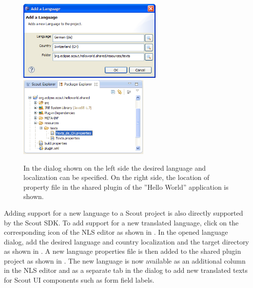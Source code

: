 \documentclass[a4paper,10pt,twoside]{book}
\begin{document}
\begin{figure}
\includegraphics[height=4cm]{sdk_add_language_dialog.png} \hspace{0.5cm}
\includegraphics[height=4cm]{sdk_shared_plugin_language_file.png}
\caption{In the dialog  shown on the left side the desired language and localization can be specified.
On the right side, the location of property file  in the shared plugin of the ''Hello World'' application is shown.
}
\end{figure}

Adding support for a new language to a Scout project is also directly supported by the Scout SDK. 
To add support for a new translated language, click on the corresponding icon of the NLS editor as shown in .
In the opened language dialog, add the desired language and country localization and the target directory as shown in .
A new language properties file is then added to the shared plugin project as shown in .
The new language is now available as an additional column in the NLS editor and as a separate tab in the dialog to add new translated texts for Scout UI components such as form field labels.

\ifx\wholebook\relax\else
   
   
\end{document}

